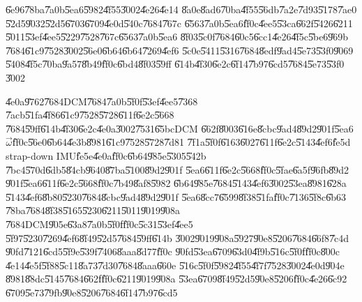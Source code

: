 \documentclass[12pt,a4paper]{article}
\begin{document}
\U{6e96}\U{78ba}\U{7a0b}\U{5ea6}\U{5982}\U{4f55}\U{3002}\U{4e26}\U{4e14}%
\U{8a0e}\U{8ad6}\U{70ba}\U{4f55}\U{56db}\U{7a2e}\U{7d93}\U{5178}\U{7ae0}%
\U{52d5}\U{9032}\U{52d5}\U{6703}\U{6709}\U{4e0d}\U{540c}\U{7684}\U{767c}%
\U{6563}\U{7a0b}\U{5ea6}\U{ff0c}\U{4ee5}\U{53ca}\U{662f}\U{5426}\U{6211}%
\U{5011}\U{53ef}\U{4ee5}\U{5229}\U{7528}\U{767c}\U{6563}\U{7a0b}\U{5ea6}%
\U{8f03}\U{5c0f}\U{7684}\U{60c5}\U{6cc1}\U{4e26}\U{4f5c}\U{5be6}\U{969b}%
\U{7684}\U{61c9}\U{7528}\U{3002}\U{56e0}\U{6b64}\U{6b64}\U{7269}\U{4ef6}%
\U{5c0e}\U{5411}\U{5316}\U{7684}\U{8edf}\U{9ad4}\U{5e73}\U{53f0}\U{9069}%
\U{5408}\U{4f5c}\U{70ba}\U{9a57}\U{8b49}\U{ff0c}\U{6bd4}\U{8f03}\U{59ff}%
\U{614b}\U{4f30}\U{6e2c}\U{6f14}\U{7b97}\U{6cd5}\U{7684}\U{5e73}\U{53f0}%
\U{3002}

\bigskip

\U{4e0a}\U{9762}\U{7684}DCM\U{7684}\U{7a0b}\U{5f0f}\U{53ef}\U{4ee5}\U{7368}%
\U{7acb}\U{51fa}\U{4f86}\U{61c9}\U{7528}\U{5728}\U{611f}\U{6e2c}\U{5668}%
\U{7684}\U{59ff}\U{614b}\U{4f30}\U{6e2c}\U{4e0a}\U{3002}\U{7531}\U{65bc}DCM%
\U{662f}\U{8003}\U{616e}\U{8cbc}\U{9ad4}\U{89d2}\U{901f}\U{5ea6}$\vec{\omega}
$\U{ff0c}\U{56e0}\U{6b64}\U{4e3b}\U{8981}\U{61c9}\U{7528}\U{5728}\U{7d81}%
\U{7f1a}\U{5f0f}\U{6163}\U{6027}\U{611f}\U{6e2c}\U{5143}\U{4ef6}\U{fe5d}%
strap-down IMU\U{fe5e}\U{4e0a}\U{ff0c}\U{6b64}\U{985e}\U{5305}\U{542b}%
\U{7bc4}\U{570d}\U{6db5}\U{84cb}\U{9640}\U{87ba}\U{5100}\U{89d2}\U{901f}%
\U{5ea6}\U{611f}\U{6e2c}\U{5668}\U{ff0c}\U{5fae}\U{6a5f}\U{96fb}\U{89d2}%
\U{901f}\U{5ea6}\U{611f}\U{6e2c}\U{5668}\U{ff0c}\U{7b49}\U{8af8}\U{5982}%
\U{6b64}\U{985e}\U{7684}\U{5143}\U{4ef6}\U{3002}\U{53ea}\U{8981}\U{628a}%
\U{5143}\U{4ef6}\U{8b80}\U{5230}\U{7684}\U{8cbc}\U{9ad4}\U{89d2}\U{901f}%
\U{5ea6}\U{8cc7}\U{6599}\U{8f38}\U{51fa}\U{ff0c}\U{7136}\U{5f8c}\U{6b63}%
\U{78ba}\U{7684}\U{8f38}\U{5165}\U{5230}\U{6211}\U{5011}\U{9019}\U{908a}%
\U{7684}DCM\U{905e}\U{63a8}\U{7a0b}\U{5f0f}\U{ff0c}\U{5c31}\U{53ef}\U{4ee5}%
\U{5f97}\U{5230}\U{7269}\U{4ef6}\U{8f49}\U{52d5}\U{7684}\U{59ff}\U{614b}%
\U{3002}\U{9019}\U{908a}\U{5927}\U{90e8}\U{5206}\U{7684}\U{66f8}\U{7c4d}%
\U{90fd}\U{7121}\U{6cd5}\U{5f9e}\U{539f}\U{7406}\U{8aaa}\U{8d77}\U{ff0c}%
\U{90fd}\U{53ea}\U{6709}\U{63d0}\U{4f9b}\U{516c}\U{5f0f}\U{ff0c}\U{800c}%
\U{4e14}\U{4e5f}\U{5f88}\U{5c11}\U{8a73}\U{7d30}\U{7684}\U{8aaa}\U{660e}%
\U{516c}\U{5f0f}\U{5982}\U{4f55}\U{4f7f}\U{7528}\U{3002}\U{4e0d}\U{904e}%
\U{8981}\U{88dc}\U{5145}\U{7684}\U{662f}\U{ff0c}\U{6211}\U{9019}\U{908a}%
\U{53ea}\U{6709}\U{8f49}\U{52d5}\U{90e8}\U{5206}\U{ff0c}\U{4e26}\U{6c92}%
\U{6709}\U{5e73}\U{79fb}\U{90e8}\U{5206}\U{7684}\U{6f14}\U{7b97}\U{6cd5}%
\end{document}

